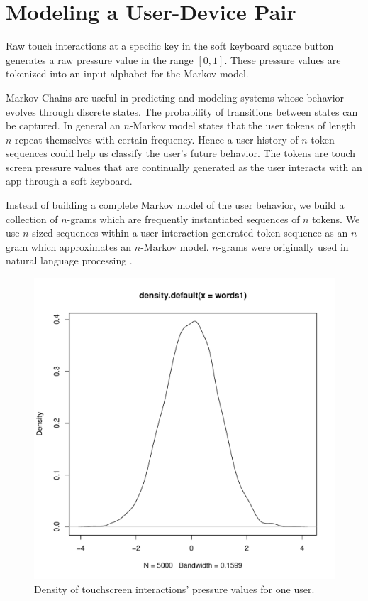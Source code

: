 \documentclass{acm_proc_article-sp}
\begin{document}

\section{Modeling a User-Device Pair}
\label{sec:modeling}
Raw touch interactions at a specific key in the soft keyboard square button
generates a raw pressure value in the range $[0,1]$. These pressure values are tokenized
into an input alphabet for the Markov model.

Markov Chains are useful in predicting and modeling systems whose behavior evolves through discrete states. 
The probability of transitions between states can be captured.
In general an $n$-Markov model states that the
user tokens of length $n$ repeat themselves with certain frequency.
Hence a user history of $n$-token sequences could help us classify the user's future behavior. The tokens are
touch screen pressure values that are continually generated as the user interacts with an app
through a soft keyboard.


Instead of building a complete Markov model of the user behavior,
we build a collection of $n$-grams
which are frequently instantiated sequences of $n$ tokens.
We use $n$-sized sequences 
within a user interaction
generated token sequence as an
$n$-gram which approximates an $n$-Markov model.
$n$-grams were originally
used in natural language processing \cite{Brown:ngram}.

\begin{figure}
\centering
\includegraphics[page=2, width=.45\textwidth, keepaspectratio]{Rplots.pdf}
\caption{
Density of touchscreen interactions' pressure values for one user.
}
\label{fig:normal_distribution}
\end{figure}
\end{document}
